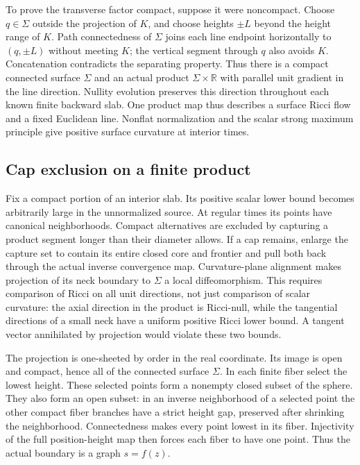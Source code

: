 To prove the transverse factor compact, suppose it were noncompact.
Choose $q\in\Sigma$ outside the projection
of $K$, and choose heights $\pm L$ beyond the height range of $K$.
Path connectedness of $\Sigma$ joins each line endpoint horizontally to
$(q,\pm L)$ without meeting $K$; the vertical segment through $q$ also
avoids $K$. Concatenation contradicts the separating property. Thus there
is a compact connected surface $\Sigma$ and an actual product
$\Sigma\times\mathbb R$ with parallel unit gradient in the line
direction. Nullity evolution preserves this direction throughout
each known finite backward slab. One product map thus describes a surface
Ricci flow and a fixed Euclidean line. Nonflat normalization and the
scalar strong maximum principle give positive surface curvature at
interior times.

\subsection{Cap exclusion on a finite product}

Fix a compact portion of an interior slab. Its positive scalar lower
bound becomes arbitrarily large in the unnormalized source. At regular
times its points have canonical neighborhoods. Compact alternatives are
excluded by capturing a product segment longer than their diameter allows.
If a cap remains, enlarge the capture set to contain its entire closed
core and frontier and pull both back through the actual inverse convergence
map. Curvature-plane alignment makes projection of its neck boundary to
$\Sigma$ a local diffeomorphism. This requires comparison of Ricci on
all unit directions, not just comparison of scalar curvature: the axial
direction in the product is Ricci-null, while the tangential directions
of a small neck have a uniform positive Ricci lower bound. A tangent
vector annihilated by projection would violate these two bounds.

The projection is one-sheeted by order in the real coordinate. Its image
is open and compact, hence all of the connected surface $\Sigma$.
In each finite fiber select the lowest height. These selected points
form a nonempty closed subset of the sphere. They also form an open
subset: in an inverse neighborhood of a selected point the other compact
fiber branches have a strict height gap, preserved after shrinking the
neighborhood. Connectedness makes every point lowest in its fiber.
Injectivity of the full position-height map then forces each fiber to
have one point. Thus the actual boundary is a graph $s=f(z)$.

